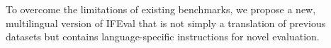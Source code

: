 To overcome the limitations of existing benchmarks, we propose a new, multilingual version of IFEval that is not simply a translation of previous datasets but contains language-specific instructions for novel evaluation.

